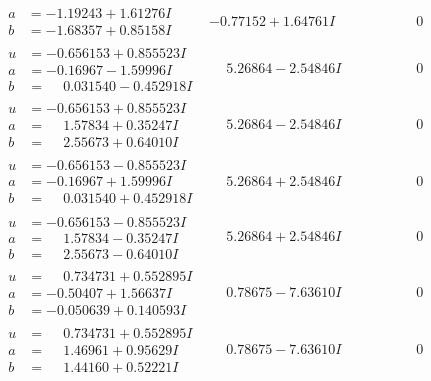 \documentclass[1p]{elsarticle_modified}
\theoremstyle{definition}
\begin{document}
$$\begin{array}{c|c|c}
\begin{aligned}
a &= -1.19243 + 1.61276 I \\
b &= -1.68357 + 0.85158 I\end{aligned}
 & -0.77152 + 1.64761 I & \phantom{-0.000000 } 0 \\ \hline\begin{aligned}
u &= -0.656153 + 0.855523 I \\
a &= -0.16967 - 1.59996 I \\
b &= \phantom{-}0.031540 - 0.452918 I\end{aligned}
 & \phantom{-}5.26864 - 2.54846 I & \phantom{-0.000000 } 0 \\ \hline\begin{aligned}
u &= -0.656153 + 0.855523 I \\
a &= \phantom{-}1.57834 + 0.35247 I \\
b &= \phantom{-}2.55673 + 0.64010 I\end{aligned}
 & \phantom{-}5.26864 - 2.54846 I & \phantom{-0.000000 } 0 \\ \hline\begin{aligned}
u &= -0.656153 - 0.855523 I \\
a &= -0.16967 + 1.59996 I \\
b &= \phantom{-}0.031540 + 0.452918 I\end{aligned}
 & \phantom{-}5.26864 + 2.54846 I & \phantom{-0.000000 } 0 \\ \hline\begin{aligned}
u &= -0.656153 - 0.855523 I \\
a &= \phantom{-}1.57834 - 0.35247 I \\
b &= \phantom{-}2.55673 - 0.64010 I\end{aligned}
 & \phantom{-}5.26864 + 2.54846 I & \phantom{-0.000000 } 0 \\ \hline\begin{aligned}
u &= \phantom{-}0.734731 + 0.552895 I \\
a &= -0.50407 + 1.56637 I \\
b &= -0.050639 + 0.140593 I\end{aligned}
 & \phantom{-}0.78675 - 7.63610 I & \phantom{-0.000000 } 0 \\ \hline\begin{aligned}
u &= \phantom{-}0.734731 + 0.552895 I \\
a &= \phantom{-}1.46961 + 0.95629 I \\
b &= \phantom{-}1.44160 + 0.52221 I\end{aligned}
 & \phantom{-}0.78675 - 7.63610 I & \phantom{-0.000000 } 0\\

\end{array}$$
\end{document}
